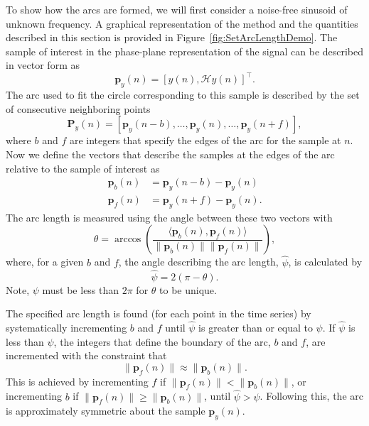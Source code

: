 \documentclass[11pt,draftcls,onecolumn]{IEEEtran}
\begin{document}
To show how the arcs are formed, we will first consider a noise-free sinusoid of unknown frequency. A graphical representation of the method and the quantities described in this section is provided in Figure~\ref{fig:SetArcLengthDemo}. The sample of interest in the phase-plane representation of the signal can be described in vector form as
\begin{equation}
	\mathbf{p}_y(n) = \left[y\left(n\right),\mathcal{H}y\left(n\right)\right]^{\top}.
\end{equation}
The arc used to fit the circle corresponding to this sample is described by the set of consecutive neighboring points
\begin{equation}
	\mathbf{P}_y(n) = \left[\mathbf{p}_y(n-b),\hdots,\mathbf{p}_y(n),\hdots,\mathbf{p}_y(n+f)\right],
\end{equation}
where $b$ and $f$ are integers that specify the edges of the arc for the sample at $n$. Now we define the vectors that describe the samples at the edges of the arc relative to the sample of interest as
\begin{align}
	\mathbf{p}_b(n) &= \mathbf{p}_y(n-b)-\mathbf{p}_y(n) \\
	\mathbf{p}_f(n) &= \mathbf{p}_y(n+f)-\mathbf{p}_y(n).
\end{align}
The arc length is measured using the angle between these two vectors with
\begin{equation}
	\theta = \arccos\left(\frac{\langle\mathbf{p}_b(n),\mathbf{p}_f(n)\rangle}{\|\mathbf{p}_b(n)\| \|\mathbf{p}_f(n)\|}\right),
\end{equation}
where, for a given $b$ and $f$, the angle describing the arc length, $\hat\psi$, is calculated by
\begin{equation}\label{eq:theta_2_psi}
	\hat\psi = 2(\pi-\theta).
\end{equation}
Note, $\psi$ must be less than $2\pi$ for $\theta$ to be unique.

The specified arc length is found (for each point in the time series) by systematically incrementing $b$ and $f$ until $\hat\psi$ is greater than or equal to $\psi$. If $\hat\psi$ is less than $\psi$, the integers that define the boundary of the arc, $b$ and $f$, are incremented with the constraint that
\begin{equation}\label{eq:balanced_distances}
	\|\mathbf{p}_f(n)\| \approx \|\mathbf{p}_b(n)\|.
\end{equation}
This is achieved by incrementing $f$ if $\|\mathbf{p}_f(n)\| < \|\mathbf{p}_b(n)\|$, or incrementing $b$ if $\|\mathbf{p}_f(n)\| \ge \|\mathbf{p}_b(n)\|$, until $\hat\psi > \psi$. Following this, the arc is approximately symmetric about the sample $\mathbf{p}_y(n)$. 
\end{document}
